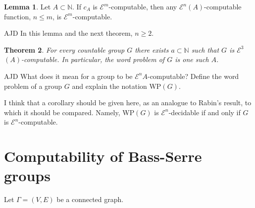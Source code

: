 \documentclass[a4paper]{article}
\newcommand{\grz}[1]{$\mathcal{E}^{#1}$}	%
\newcommand{\NN}{\mathbb{N}}	%
\theoremstyle{plain}
\newtheorem{theorem}{Theorem}[section]
\theoremstyle{definition}
\newtheorem{lemma}[theorem]{Lemma}
\newtheorem{definition}[theorem]{Definition}
\newenvironment{ad}{\noindent\color{green} AJD }{}
\newcommand{\ajd}[1]{
\begin{ad} #1 \end{ad}}
\begin{document}
\begin{lemma} \label{relativetonormalcomputable}
	Let $A \subset \NN$. If $c_A$ is \grz{m}-computable, then any \grz{n}$(A)$-computable function, $n \leq m$, is \grz{m}-computable.
\end{lemma}
\ajd{In this lemma and the next theorem, $n\ge 2$.}
\begin{theorem} \cite[3.2]{Cannonito_1973} \label{wp-computable-implies-group}
	For every countable group $G$ there exists $a \subset \NN$ such that $G$ is \grz{3}$(A)$-computable. In particular, the word problem of $G$ is one such $A$.
\end{theorem}
\ajd{What does it mean for a group to be \grz{n}$A$-computable?
Define the word problem of a group $G$ and explain the notation WP$(G)$.

I think that a corollary should be given here, as an analogue to
Rabin's result, to which it should be compared. Namely, WP$(G)$ is 
\grz{n}-decidable if and only if $G$ is \grz{n}-computable.}

\begin{comment}
		\begin{definition} \cite[3.3]{Cannonito_1973}
			A group $G$ is ``standard'' relative to an index $(i,m,j)$ if $i$ is defined by minimalization from a presentation $1 \rightarrow K \rightarrow F \rightarrow G \rightarrow 1$ for $F$ free on at most countably many generators, $n \geq 3$, and $A \subset \NN$.
		\end{definition}

		\begin{theorem} \cite[3.4]{Cannonito_1973}
			If $G$ is finitely generated and \grz{n}$(A)$ for $n \geq 3$ then any standard index of $G$ is \grz{n}$(A)$.
		\end{theorem}
\end{comment}

\section{Computability of Bass-Serre groups \label{bass-serre}}

Let $\Gamma = (V,E)$ be a connected graph. 
\end{document}
